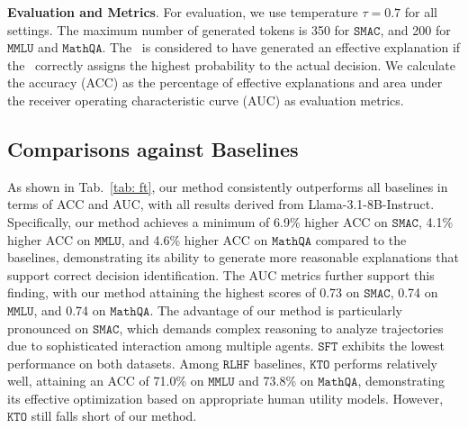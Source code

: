\textbf{Evaluation and Metrics}. 
For evaluation, we use temperature $\tau=0.7$ for all settings. The maximum number of generated tokens is 350 for $\mathtt{SMAC}$, and 200 for $\mathtt{MMLU}$ and $\mathtt{MathQA}$. The \elm~is considered to have generated an effective explanation if the \rlm~correctly assigns the highest probability to the actual decision. We calculate the accuracy (ACC) as the percentage of effective explanations and area under the receiver operating characteristic curve (AUC) as evaluation metrics.


\subsection{Comparisons against Baselines}

As shown in Tab.~\ref{tab: ft}, our method consistently outperforms all baselines in terms of ACC and AUC, with all results derived from Llama-3.1-8B-Instruct. Specifically, our method achieves a minimum of 6.9\% higher ACC on $\mathtt{SMAC}$, 4.1\% higher ACC on $\mathtt{MMLU}$, and 4.6\% higher ACC on $\mathtt{MathQA}$ compared to the baselines, demonstrating its ability to generate more reasonable explanations that support correct decision identification. The AUC metrics further support this finding, with our method attaining the highest scores of 0.73 on $\mathtt{SMAC}$, 0.74 on $\mathtt{MMLU}$, and 0.74 on $\mathtt{MathQA}$. The advantage of our method is particularly pronounced on $\mathtt{SMAC}$, which demands complex reasoning to analyze trajectories due to sophisticated interaction among multiple agents. $\mathtt{SFT}$ exhibits the lowest performance on both datasets. Among $\mathtt{RLHF}$ baselines, $\mathtt{KTO}$ performs relatively well, attaining an ACC of 71.0\% on $\mathtt{MMLU}$ and 73.8\% on $\mathtt{MathQA}$, demonstrating its effective optimization based on appropriate human utility models. However, $\mathtt{KTO}$ still falls short of our method.

